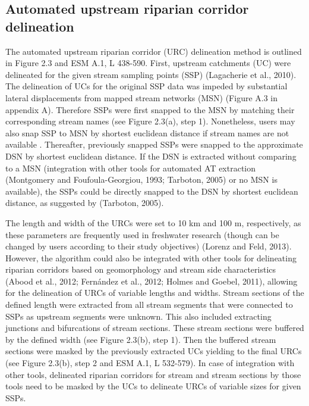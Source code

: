 \subsection{Automated upstream riparian corridor delineation}
\label{Automated upstream riparian corridor delineation}

The automated upstream riparian corridor (URC) delineation method is outlined in Figure 2.3 and ESM A.1, L 438-590. First, upstream catchments (UC) were delineated for the given stream sampling points (SSP) (Lagacherie et al., 2010). The delineation of UCs for the original SSP data was impeded by substantial lateral displacements from mapped stream networks (MSN) (Figure A.3 in appendix A). Therefore SSPs were first snapped to the  MSN by matching their corresponding stream names (see Figure 2.3(a), step 1). Nonetheless, users may also snap SSP to MSN by shortest euclidean distance if stream names are not available . Thereafter, previously snapped SSPs were snapped to the approximate DSN by shortest euclidean distance. If the DSN is extracted without comparing to a MSN (integration with other tools for automated AT extraction (Montgomery and Foufoula-Georgiou, 1993; Tarboton, 2005) or no MSN is available), the SSPs could be directly snapped to the DSN by shortest euclidean distance, as suggested by (Tarboton, 2005).

The length and width of the URCs were set to 10 km and 100 m, respectively, as these parameters are frequently used in freshwater research (though can be changed by users according to their study objectives) (Lorenz and Feld, 2013). However, the algorithm could also be integrated with other tools for delineating riparian corridors based on geomorphology and stream side characteristics (Abood et al., 2012; Fernández et al., 2012; Holmes and Goebel, 2011), allowing for the delineation of URCs of variable lengths and widths. Stream sections of the defined length were extracted from all stream segments that were connected to SSPs as upstream segments were unknown. This also included extracting junctions and bifurcations of stream sections. These stream sections were buffered by the defined width (see Figure 2.3(b), step 1). Then the buffered stream sections were masked by the previously extracted UCs yielding to the final URCs (see Figure 2.3(b), step 2 and ESM A.1, L 532-579). In case of integration with other tools, delineated riparian corridors for stream and stream sections by those tools need to be masked by the UCs to delineate URCs of variable sizes for given SSPs.


